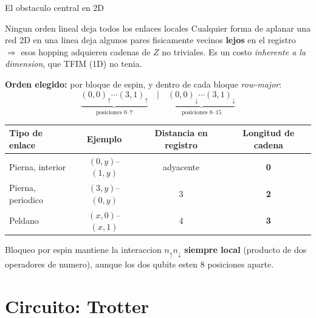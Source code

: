 \documentclass[aspectratio=169,10pt]{beamer}
\newcommand{\good}[1]{\textcolor{qAccent}{\textbf{#1}}}
\newcommand{\warn}[1]{\textcolor{qWarn}{\textbf{#1}}}
\begin{document}
\begin{frame}{El obstaculo central en 2D}
  \begin{block}{Ningun orden lineal deja todos los enlaces locales}
    Cualquier forma de aplanar una red 2D en una linea deja algunos pares fisicamente
    vecinos \textbf{lejos} en el registro $\Rightarrow$ esos hopping adquieren cadenas de $Z$
    no triviales. Es un costo \emph{inherente a la dimension}, que TFIM (1D) no tenia.
  \end{block}
  \textbf{Orden elegido:} por bloque de espin, y dentro de cada bloque \emph{row-major}:
  \[
    \underbrace{(0,0)_\uparrow \cdots (3,1)_\uparrow}_{\text{posiciones }0\text{--}7}
    \quad\Big|\quad
    \underbrace{(0,0)_\downarrow \cdots (3,1)_\downarrow}_{\text{posiciones }8\text{--}15}
  \]
  \centering
  \begin{tabular}{lccc}
    \toprule
    Tipo de enlace & Ejemplo & Distancia en registro & \textbf{Longitud de cadena} \\
    \midrule
    Pierna, interior & $(0,y)$--$(1,y)$ & adyacente & \good{0} \\
    Pierna, periodico & $(3,y)$--$(0,y)$ & 3 & \good{2} \\
    Peldano & $(x,0)$--$(x,1)$ & 4 & \warn{3} \\
    \bottomrule
  \end{tabular}
  \vspace{0.4em}
  \small Bloqueo por espin mantiene la interaccion $n_\uparrow n_\downarrow$ \good{siempre local}
  (producto de dos operadores de numero), aunque los dos qubits esten 8 posiciones aparte.
\end{frame}

\section{Circuito: Trotter}
\end{document}
